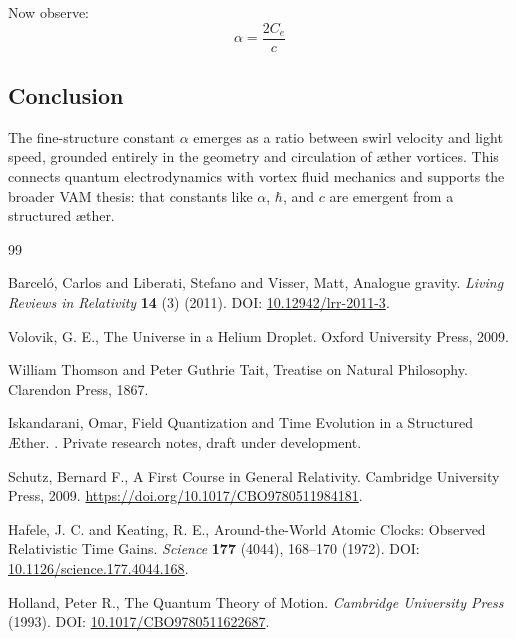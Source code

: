 \documentclass[preprint]{revtex4-2}
\begin{document}
Now observe:
\begin{equation}
    \boxed{
        \alpha = \frac{2 C_e}{c}
    }
\end{equation}

\subsection*{Conclusion}

The fine-structure constant \( \alpha \) emerges as a ratio between swirl velocity and light speed, grounded entirely in the geometry and circulation of æther vortices. This connects quantum electrodynamics with vortex fluid mechanics and supports the broader VAM thesis: that constants like \( \alpha \), \( \hbar \), and \( c \) are emergent from a structured æther.

\begin{thebibliography}{99}

Barcel\'o, Carlos and Liberati, Stefano and Visser, Matt,
\newblock Analogue gravity.
\textit{Living Reviews in Relativity} \textbf{14} (3) (2011).
\newblock DOI: \href{https://doi.org/10.12942/lrr-2011-3}{10.12942/lrr-2011-3}.


Volovik, G. E.,
\newblock The Universe in a Helium Droplet.
\newblock Oxford University Press, 2009.


William Thomson and Peter Guthrie Tait,
\newblock Treatise on Natural Philosophy.
\newblock Clarendon Press, 1867.


Iskandarani, Omar,
\newblock Field Quantization and Time Evolution in a Structured Æther.
.
\newblock Private research notes, draft under development.


Schutz, Bernard F.,
\newblock A First Course in General Relativity.
\newblock Cambridge University Press, 2009.
\newblock \url{https://doi.org/10.1017/CBO9780511984181}.


Hafele, J. C. and Keating, R. E.,
\newblock Around-the-World Atomic Clocks: Observed Relativistic Time Gains.
\textit{Science} \textbf{177} (4044), 168--170 (1972).
\newblock DOI: \href{https://doi.org/10.1126/science.177.4044.168}{10.1126/science.177.4044.168}.


Holland, Peter R.,
\newblock The Quantum Theory of Motion.
\textit{Cambridge University Press} (1993).
\newblock DOI: \href{https://doi.org/10.1017/CBO9780511622687}{10.1017/CBO9780511622687}.



\end{thebibliography}
\end{document}
